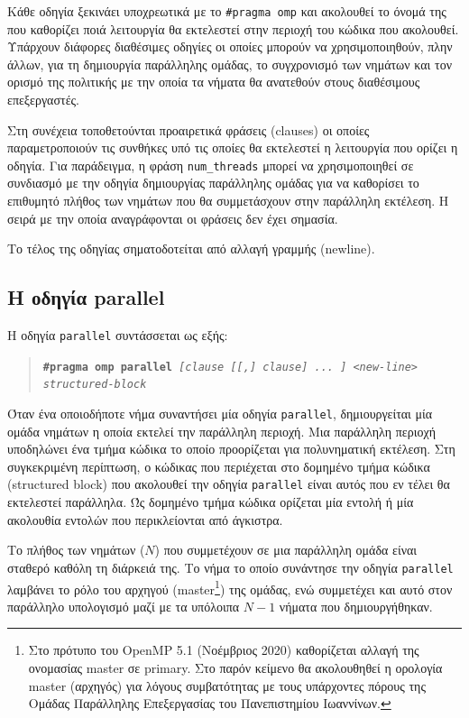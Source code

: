 Κάθε οδηγία ξεκινάει υποχρεωτικά με το \texttt{\#pragma omp} και ακολουθεί το όνομά της που καθορίζει ποιά λειτουργία θα εκτελεστεί στην περιοχή του κώδικα που ακολουθεί. Υπάρχουν διάφορες διαθέσιμες οδηγίες οι οποίες μπορούν να χρησιμοποιηθούν, πλην άλλων, για τη δημιουργία παράλληλης ομάδας, το συγχρονισμό των νημάτων και τον ορισμό της πολιτικής με την οποία τα νήματα θα ανατεθούν στους διαθέσιμους επεξεργαστές.

Στη συνέχεια τοποθετούνται προαιρετικά φράσεις (clauses) οι οποίες παραμετροποιούν τις συνθήκες υπό τις οποίες θα εκτελεστεί η λειτουργία που ορίζει η οδηγία. Για παράδειγμα, η φράση \texttt{num\_threads} μπορεί να χρησιμοποιηθεί σε συνδιασμό με την οδηγία δημιουργίας παράλληλης ομάδας για να καθορίσει το επιθυμητό πλήθος των νημάτων που θα συμμετάσχουν στην παράλληλη εκτέλεση. Η σειρά με την οποία αναγράφονται οι φράσεις δεν έχει σημασία.

Το τέλος της οδηγίας σηματοδοτείται από αλλαγή γραμμής (newline).

\subsection{Η οδηγία parallel}
\label{ssec:parallel construct}
Η οδηγία \texttt{parallel} συντάσσεται ως εξής:

\begin{quote}
	\texttt{\textbf{\#pragma omp parallel} \textit{[clause [[,] clause] ... ] <new-line>}} \\
		\texttt{\textit{structured-block}}
\end{quote}

Όταν ένα οποιοδήποτε νήμα συναντήσει μία οδηγία \texttt{parallel}, δημιουργείται μία ομάδα νημάτων η οποία εκτελεί την παράλληλη περιοχή. Μια παράλληλη περιοχή υποδηλώνει ένα τμήμα κώδικα το οποίο προορίζεται για πολυνηματική εκτέλεση. Στη συγκεκριμένη περίπτωση, ο κώδικας που περιέχεται στο δομημένο τμήμα κώδικα (structured block) που ακολουθεί την οδηγία \texttt{parallel} είναι αυτός που εν τέλει θα εκτελεστεί παράλληλα. Ώς δομημένο τμήμα κώδικα ορίζεται μία εντολή ή μία ακολουθία εντολών που περικλείονται από άγκιστρα.

Το πλήθος των νημάτων ($N$) που συμμετέχουν σε μια παράλληλη ομάδα είναι σταθερό καθόλη τη διάρκειά της. Το νήμα το οποίο συνάντησε την οδηγία \texttt{parallel} λαμβάνει το ρόλο του αρχηγού (master\footnote{Στο πρότυπο του OpenMP 5.1 (Νοέμβριος 2020) καθορίζεται αλλαγή της ονομασίας master σε primary. Στο παρόν κείμενο θα ακολουθηθεί η ορολογία master (αρχηγός) για λόγους συμβατότητας με τους υπάρχοντες πόρους της Ομάδας Παράλληλης Επεξεργασίας του Πανεπιστημίου Ιωαννίνων.}) της ομάδας, ενώ συμμετέχει και αυτό στον παράλληλο υπολογισμό μαζί με τα υπόλοιπα $N-1$ νήματα που δημιουργήθηκαν.

